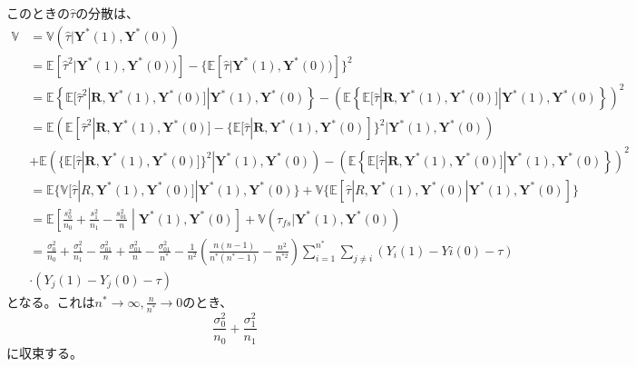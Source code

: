 \documentclass[a4paper]{bxjsarticle}
\begin{document}
このときの$\hat{\tau}$の分散は、
\begin{equation}
\begin{split}
\mathbb{V} &= \mathbb{V}(\hat{\tau} | \mathbf{Y}^\ast(1), \mathbf{Y}^\ast(0)) \\
&= \mathbb{E}[\hat{\tau}^2 | \mathbf{Y}^\ast(1), \mathbf{Y}^\ast(0))] - \{\mathbb{E}[\hat{\tau} | \mathbf{Y}^\ast(1), \mathbf{Y}^\ast(0))]\}^2\\
&= \mathbb{E}\left\{\mathbb{E}[\hat{\tau}^2| \mathbf{R}, \mathbf{Y}^\ast(1), \mathbf{Y}^\ast(0)] | \mathbf{Y}^\ast(1), \mathbf{Y}^\ast(0)\right\} - \left(\mathbb{E}\left\{ \mathbb{E}[\hat{\tau}| \mathbf{R}, \mathbf{Y}^\ast(1), \mathbf{Y}^\ast(0)] | \mathbf{Y}^\ast(1), \mathbf{Y}^\ast(0)\right\}\right)^2\\
&= \mathbb{E}\left(\mathbb{E}[\hat{\tau}^2| \mathbf{R}, \mathbf{Y}^\ast(1), \mathbf{Y}^\ast(0)] - \{\mathbb{E}[\hat{\tau}| \mathbf{R}, \mathbf{Y}^\ast(1), \mathbf{Y}^\ast(0)]\}^2 | \mathbf{Y}^\ast(1), \mathbf{Y}^\ast(0)\right) \\
&+\mathbb{E}\left(\{\mathbb{E}[\hat{\tau}| \mathbf{R}, \mathbf{Y}^\ast(1), \mathbf{Y}^\ast(0)]\}^2 | \mathbf{Y}^\ast(1), \mathbf{Y}^\ast(0)\right) - \left(\mathbb{E}\left\{ \mathbb{E}[\hat{\tau}| \mathbf{R}, \mathbf{Y}^\ast(1), \mathbf{Y}^\ast(0)] | \mathbf{Y}^\ast(1), \mathbf{Y}^\ast(0)\right\}\right)^2\\
&= \mathbb{E}\{\mathbb{V}[\hat{\tau} | R, \mathbf{Y}^\ast(1), \mathbf{Y}^\ast(0)] | \mathbf{Y}^\ast(1), \mathbf{Y}^\ast(0)\} + \mathbb{V}\{\mathbb{E} \left[\hat{\tau}| R, \mathbf{Y}^\ast(1), \mathbf{Y}^\ast(0) | \mathbf{Y}^\ast(1), \mathbf{Y}^\ast(0) \right] \} \\\
&= \mathbb{E} \left[\frac{s_0^2}{n_0} + \frac{s_1^2}{n_1} - \frac{s_{01}^2}{n} \middle\vert \mathbf{Y}^\ast(1), \mathbf{Y}^\ast(0) \right] + \mathbb{V}(\tau_{fs} | \mathbf{Y}^\ast(1), \mathbf{Y}^\ast(0)) \\\
&= \frac{\sigma_0^2}{n_0} + \frac{\sigma_1^2}{n_1} - \frac{\sigma_{01}^2}{n} + \frac{\sigma_{01}^2}{n} -\frac{\sigma_{01}^2}{n^\ast} - \frac{1}{n^2}\left(\frac{n(n-1)}{n^\ast (n^\ast - 1)} - \frac{n^2}{n^{\ast2}}\right) \sum_{i=1} ^{n^\ast} \sum_{j \neq i} (Y_i(1) - Yi(0)- \tau)  \\\ 
&\cdot (Y_j(1) - Y_j(0) - \tau)
\end{split}
\end{equation}
となる。これは$n^\ast \to \infty, \frac{n}{n^\ast} \to 0$のとき、
\begin{equation}
\frac{\sigma_0^2}{n_0} + \frac{\sigma_1^2}{n_1}    
\end{equation}
に収束する。
\end{document}
